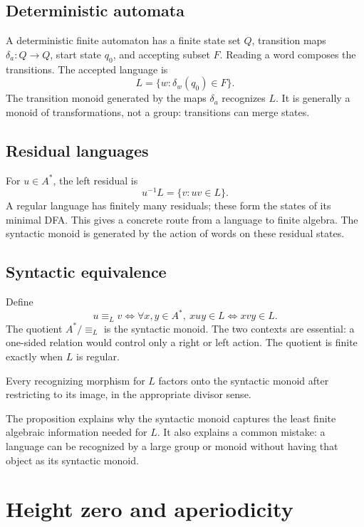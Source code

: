 \documentclass{amsart}
\begin{document}
\subsection{Deterministic automata}

A deterministic finite automaton has a finite state set $Q$, transition maps $\delta_a:Q\to Q$, start state $q_0$, and accepting subset $F$.  Reading a word composes the transitions.  The accepted language is
\[
L=\{w:\delta_w(q_0)\in F\}.
\]
The transition monoid generated by the maps $\delta_a$ recognizes $L$.  It is generally a monoid of transformations, not a group: transitions can merge states.

\subsection{Residual languages}

For $u\in A^\ast$, the left residual is
\[
  u^{-1}L=\{v:uv\in L\}.
\]
A regular language has finitely many residuals; these form the states of its minimal DFA.  This gives a concrete route from a language to finite algebra.  The syntactic monoid is generated by the action of words on these residual states.

\subsection{Syntactic equivalence}

Define
\[
  u\equiv_L v
  \Longleftrightarrow
  \forall x,y\in A^\ast,\ xuy\in L\Longleftrightarrow xvy\in L.
\]
The quotient $A^\ast/\!\equiv_L$ is the syntactic monoid.  The two contexts are essential: a one-sided relation would control only a right or left action.  The quotient is finite exactly when $L$ is regular.

\begin{proposition}
Every recognizing morphism for $L$ factors onto the syntactic monoid after restricting to its image, in the appropriate divisor sense.
\end{proposition}
The proposition explains why the syntactic monoid captures the least finite algebraic information needed for $L$.  It also explains a common mistake: a language can be recognized by a large group or monoid without having that object as its syntactic monoid.

\section{Height zero and aperiodicity}
\end{document}
